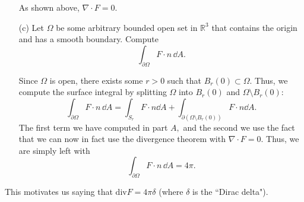 \documentclass[11pt]{article}
\newcommand{\bbR}{\mathbb{R}}
\begin{document}
\begin{itemize}
\begin{solution}
    
\end{solution}
\begin{solution}
    As shown above, $\nabla \cdot F = 0.$
\end{solution}
\item[(c)] Let $\Omega$ be some arbitrary bounded open set in $\bbR^3$ that contains
the origin and has a smooth boundary. Compute
\begin{equation*}
\int_{\partial \Omega}F\cdot n \, \dd A.
\end{equation*}
\begin{solution}
   Since $\Omega$ is open, there exists some $r>0$ such that $B_r(0)\subset \Omega.$ Thus, we compute the surface integral by splitting $\Omega$ into $B_r(0)$ and $\Omega \setminus B_r(0):$ 
   \[\int_{\partial \Omega}F\cdot n \, \dd A = \int_{S_r}F\cdot n \dd A + \int_{\partial (\Omega\setminus B_{r}(0))} F\cdot n \dd A.\] The first term we have computed in part $A,$ and the second we use the fact that we can now in fact use the divergence theorem with $\nabla \cdot F = 0.$ Thus, we are simply left with 
   \[\int_{\partial \Omega}F\cdot n \, \dd A = 4\pi.\]
\end{solution}
\end{itemize}

\begin{reflection}
This motivates us saying that $\mathrm{div}F=4\pi\delta$ (where $\delta$ is
the ``Dirac delta").
\end{reflection}

\newpage
\end{document}
